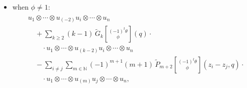 \documentclass[9pt]{amsart}
\begin{document}
\begin{itemize}
\begin{align} \label{106}
\begin{split}
    & u_1 \otimes \cdots \otimes u_{(-1)} u_j \otimes \cdots \otimes u_n \\
    &\quad - \sum_{k \in \mathbb{Z}_+} \left(
        \tilde{G}_{k} \genfrac[]{0pt}{0}{(-1)^t \theta}{\phi}(q)
        - \delta_{k,1} \cdot \frac{2\pi i}{1 - \theta^{-1}}
    \right) \cdot \\
    &\qquad \cdot u_1 \otimes \cdots \otimes u_{(k-1)} u_j \otimes \cdots \otimes u_n \\
    &\quad - \sum_{i \neq j} \sum_{m \in \mathbb{N}} \left(
        (-1)^{m+1} \tilde{P}_{m+1}
        \genfrac[]{0pt}{0}{(-1)^t \theta}{\phi}(z_i - z_j, q)
        - \delta_{0,m} \cdot \frac{2\pi i}{1 - \theta^{-1}}
    \right) \cdot \\
    &\qquad \cdot u_1 \otimes \cdots \otimes u_{(m)} u_i \otimes \cdots \otimes u_n
\end{split}
\end{align}
\begin{align*}
\begin{split}
    &= u_1 \otimes \cdots \otimes u_{(-1)} u_l \otimes \cdots \otimes u_n \\
    &\quad - \sum_{k \in \mathbb{Z}_+} \left(
        \tilde{G}_{k} \genfrac[]{0pt}{0}{(-1)^t \theta}{\phi}(q)
        - \delta_{k,1} \cdot \frac{2\pi i}{1 - \theta^{-1}}
    \right) \cdot \\
    &\qquad \cdot u_1 \otimes \cdots \otimes u_{(k-1)} u_l \otimes \cdots \otimes u_n \\
    &\quad - \sum_{i \neq j} \sum_{m \in \mathbb{N}} \left(
        (-1)^{m+1} \tilde{P}_{m+1}
        \genfrac[]{0pt}{0}{(-1)^t \theta}{\phi}(z_i - z_l, q)
        - \delta_{0,m} \cdot \frac{2\pi i}{1 - \theta^{-1}}
    \right) \cdot \\
    &\qquad \cdot u_1 \otimes \cdots \otimes u_{(m)} u_l \otimes \cdots \otimes u_n,
\end{split}
\end{align*}

    \item when $\phi \neq 1$:
   \begin{align} \label{44}
\begin{split}
    & u_1 \otimes \cdots \otimes u_{(-2)} u_i \otimes \cdots \otimes u_n \\
    &\quad + \sum_{k \geq 2} (k - 1)\,
    \tilde{G}_{k} \genfrac[]{0pt}{0}{(-1)^t \theta}{\phi}(q) \cdot \\
    &\qquad \cdot u_1 \otimes \cdots \otimes u_{(k - 2)} u_i \otimes \cdots \otimes u_n \\
    &\quad - \sum_{i \neq j} \sum_{m \in \mathbb{N}} (-1)^{m + 1} (m + 1)\,
    \tilde{P}_{m + 2} \genfrac[]{0pt}{0}{(-1)^t \theta}{\phi}(z_i - z_j, q) \cdot \\
    &\qquad \cdot u_1 \otimes \cdots \otimes u_{(m)} u_j \otimes \cdots \otimes u_n,
\end{split}
\end{align}


\end{itemize}
\end{document}
